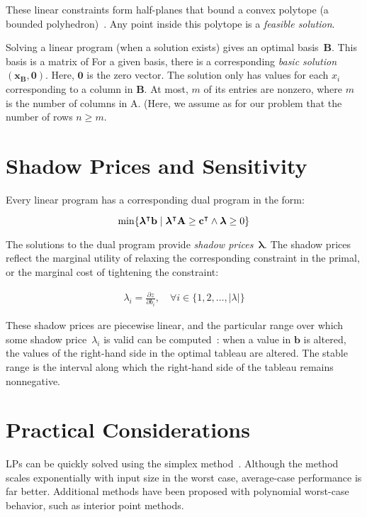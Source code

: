 These linear constraints form half-planes that bound a convex polytope (a bounded polyhedron)~\cite{nemhauser1988integer}. Any point inside this polytope is a \emph{feasible solution}. 

Solving a linear program (when a solution exists) gives an optimal basis~$\mathbf{B}$. This basis is a matrix of  For a given basis, there is a corresponding \emph{basic solution}~$(\mathbf{x_B}, \mathbf{0})$. Here, $\mathbf{0}$ is the zero vector. The solution only has values for each $x_i$ corresponding to a column in $\mathbf{B}$. At most, $m$ of its entries are nonzero, where $m$ is the number of columns in A. (Here, we assume as for our problem that the number of rows $n \geq m$. 

\section{Shadow Prices and Sensitivity}

Every linear program has a corresponding dual program in the form:

\begin{equation}
\min \{ %
\bm{\lambda} \transpose
\mathbf{b} \;|\;
\bm{\lambda} \transpose \mathbf{A} \geq \mathbf{c} \transpose \land \bm{\lambda} \geq 0 \}
\end{equation}

The solutions to the dual program provide \emph{shadow prices}~$\bm \lambda$. The shadow prices reflect the marginal utility of relaxing the corresponding constraint in the primal, or the marginal cost of tightening the constraint:

\begin{align}
\lambda_i = \frac{\partial z}{\partial b_i}, \quad \forall i \in \{1, 2, \ldots, |\lambda|\}
\end{align}

These shadow prices are piecewise linear, and the particular range over which some shadow price~$\lambda_i$ is valid can be computed~\cite{luenberger2008linear}: when a value in $\mathbf{b}$ is altered, the values of the right-hand side in the optimal tableau are altered. The stable range is the interval along which the right-hand side of the tableau remains nonnegative. 

\section{Practical Considerations}

LPs can be quickly solved using the simplex method~\cite{puterman2014markov}. Although the method scales exponentially with input size in the worst case, average-case performance is far better. Additional methods have been proposed with polynomial worst-case behavior, such as interior point methods.
